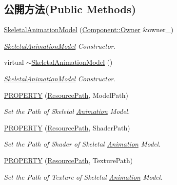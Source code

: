 \subsection*{公開方法(Public Methods)}
\begin{DoxyCompactItemize}
\item 
\hyperlink{class_i_dream_sky_1_1_skeletal_animation_model_ac94f0ee226651c47dafdc13b3180d0eb}{Skeletal\+Animation\+Model} (\hyperlink{class_i_dream_sky_1_1_component_1_1_owner}{Component\+::\+Owner} \&owner\+\_\+)
\begin{DoxyCompactList}\small\item\em \hyperlink{class_i_dream_sky_1_1_skeletal_animation_model}{Skeletal\+Animation\+Model} Constructor. \end{DoxyCompactList}\item 
virtual \hyperlink{class_i_dream_sky_1_1_skeletal_animation_model_a0cbd99297535606bf70a2528da8f04bd}{$\sim$\+Skeletal\+Animation\+Model} ()
\begin{DoxyCompactList}\small\item\em \hyperlink{class_i_dream_sky_1_1_skeletal_animation_model}{Skeletal\+Animation\+Model} Constructor. \end{DoxyCompactList}\item 
\hyperlink{class_i_dream_sky_1_1_skeletal_animation_model_a34cffa56db4ecd94ed036984e0e50019}{P\+R\+O\+P\+E\+R\+TY} (\hyperlink{class_i_dream_sky_1_1_resource_path}{Resource\+Path}, Model\+Path)
\begin{DoxyCompactList}\small\item\em Set the Path of Skeletal \hyperlink{class_i_dream_sky_1_1_skeletal_animation_model_1_1_animation}{Animation} Model. \end{DoxyCompactList}\item 
\hyperlink{class_i_dream_sky_1_1_skeletal_animation_model_a80c7171943011380cc52b2a969fd00d6}{P\+R\+O\+P\+E\+R\+TY} (\hyperlink{class_i_dream_sky_1_1_resource_path}{Resource\+Path}, Shader\+Path)
\begin{DoxyCompactList}\small\item\em Set the Path of Shader of Skeletal \hyperlink{class_i_dream_sky_1_1_skeletal_animation_model_1_1_animation}{Animation} Model. \end{DoxyCompactList}\item 
\hyperlink{class_i_dream_sky_1_1_skeletal_animation_model_a5ea54f9c513cd445452b6eb0debbfc42}{P\+R\+O\+P\+E\+R\+TY} (\hyperlink{class_i_dream_sky_1_1_resource_path}{Resource\+Path}, Texture\+Path)
\begin{DoxyCompactList}\small\item\em Set the Path of Texture of Skeletal \hyperlink{class_i_dream_sky_1_1_skeletal_animation_model_1_1_animation}{Animation} Model. \end{DoxyCompactList}\item 

\end{DoxyCompactItemize}

